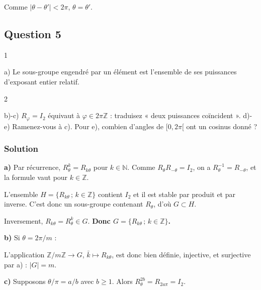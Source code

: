 \documentclass[11pt,a4paper]{article}
\newcommand{\equationajustee}[1]{%
  \sbox{\boiteequation}{$\displaystyle #1$}%
  \ifdim\wd\boiteequation>\linewidth
    \[\resizebox{\linewidth}{!}{\usebox{\boiteequation}}\]%
  \else
    \[#1\]%
  \fi}
\begin{document}
Comme \(|\theta-\theta'|<2\pi\), \(\theta=\theta'\).

\hypertarget{question-5}{%
\subsection{Question 5}\label{question-5}}

\begin{indication}{1}

a) Le sous-groupe engendré par un élément est l'ensemble de ses puissances d'exposant entier relatif.

\end{indication}

\begin{indication}{2}

b)-c) \(R_\varphi=I_2\) équivaut à \(\varphi\in2\pi\mathbb{Z}\) : traduisez « deux puissances coïncident ». d)-e) Ramenez-vous à c). Pour e), combien d'angles de \([0,2\pi[\) ont un cosinus donné ?

\end{indication}

\hypertarget{solution-4}{%
\subsubsection{Solution}\label{solution-4}}

\textbf{a)} Par récurrence, \(R_\theta^k=R_{k\theta}\) pour \(k\in\mathbb{N}\). Comme \(R_\theta R_{-\theta}=I_2\), on a \(R_\theta^{-1}=R_{-\theta}\), et la formule vaut pour \(k\in\mathbb{Z}\).

L'ensemble \(H=\{R_{k\theta}\,;\,k\in\mathbb{Z}\}\) contient \(I_2\) et il est stable par produit et par inverse. C'est donc un sous-groupe contenant \(R_\theta\), d'où \(G\subset H\).

Inversement, \(R_{k\theta}=R_\theta^k\in G\). \textbf{Donc \(G=\{R_{k\theta}\,;\,k\in\mathbb{Z}\}\).}

\textbf{b)} Si \(\theta=2\pi/m\) :

\equationajustee{\begin{aligned}R_{k\theta}=R_{\ell\theta}&\iff\frac{2\pi(k-\ell)}{m}\in2\pi\mathbb{Z}\\&\iff m\mid k-\ell.\end{aligned}}

L'application \(\mathbb{Z}/m\mathbb{Z}\to G\), \(\bar k\mapsto R_{k\theta}\), est donc bien définie, injective, et surjective par a) : \(\boxed{|G|=m}\).

\textbf{c)} Supposons \(\theta/\pi=a/b\) avec \(b\geqslant1\). Alors \(R_\theta^{2b}=R_{2a\pi}=I_2\).
\end{document}

